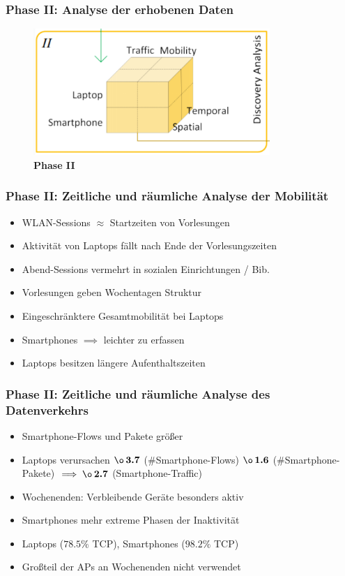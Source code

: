 \documentclass{beamer}
\begin{document}
\begin{frame}
  \frametitle{Phase II: Analyse der erhobenen Daten}
  \begin{figure}
    \centering
    \includegraphics[width=0.8\textwidth]{images/phase2.png}
    \caption*{\textbf{Phase II}}
  \end{figure}  
\end{frame}

\begin{frame}
  \frametitle{Phase II: Zeitliche und räumliche Analyse der Mobilität}
  \begin{itemize}
    \item WLAN-Sessions $\approx$ Startzeiten von Vorlesungen
    \item Aktivität von Laptops fällt nach Ende der Vorlesungszeiten
    \item Abend-Sessions vermehrt in sozialen Einrichtungen / Bib.
    \item Vorlesungen geben Wochentagen Struktur
    \item Eingeschränktere Gesamtmobilität bei Laptops
    \item Smartphones  $\implies$ leichter zu erfassen
    \item Laptops besitzen längere Aufenthaltszeiten 
  \end{itemize}
\end{frame}

\begin{frame}
  \frametitle{Phase II: Zeitliche und räumliche Analyse des Datenverkehrs}
  \begin{itemize}
    \item Smartphone-Flows und Pakete größer
    \item Laptops verursachen $\boldsymbol{\o \thinspace 3.7}$ (\#Smartphone-Flows)\newline
    \phantom \quad\quad\quad\quad\quad\quad\quad\quad\thinspace\thinspace\thinspace\thinspace\thinspace $\boldsymbol{\o \thinspace 1.6}$ (\#Smartphone-Pakete)\newline
    \phantom \quad\quad\quad\quad\quad\quad\thinspace\thinspace $\implies \boldsymbol{\o \thinspace 2.7}$ (Smartphone-Traffic)
    \item Wochenenden: Verbleibende Geräte besonders aktiv
    \item Smartphones mehr extreme Phasen der Inaktivität
    \item Laptops ($\boldsymbol{78.5 \%}$ TCP), Smartphones ($\boldsymbol{98.2 \%}$ TCP)
    \item Großteil der APs an Wochenenden nicht verwendet
  \end{itemize}
\end{frame}
\end{document}
